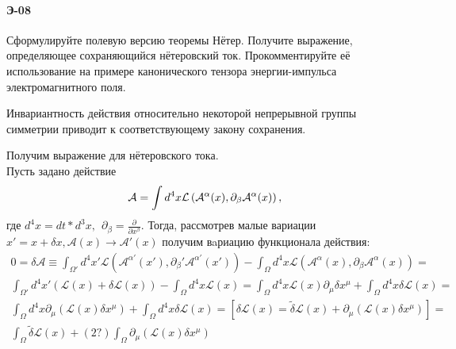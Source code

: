 


	\paragraph{Э-08}
	Сформулируйте полевую версию теоремы Нётер. Получите выражение, определяющее сохраняющийся нётеровский ток. Прокомментируйте её использование на примере канонического тензора энергии-импульса электромагнитного поля.
	
	\begin{theorem}[Нётер]
		Инвариантность действия относительно некоторой непрерывной группы симметрии приводит к соответствующему закону сохранения.
	\end{theorem}

	Получим выражение для нётеровского тока.\\
	Пусть задано действие 
	$$\mathcal{A}=\int d^4x\mathcal{L}\left( \mathcal{A}^\alpha (x),\partial_\beta \mathcal{A}^\alpha(x)\right),\\
	$$
	где $d^4x=dt*d^3x,~~\partial_\beta=\frac{\partial}{\partial x^\beta}.$ Тогда, рассмотрев малые вариации $x\prime=x+\delta x, \mathcal{A}(x)\rightarrow\mathcal{A}\prime(x)$ получим вaриацию функционала действия:
	\begin{gather*}
	0=\delta \mathcal{A}\equiv
	\int_{\Omega\prime}d^4x\prime\mathcal{L}\left(\mathcal{A}^{\alpha\prime}(x\prime),\partial_\beta\prime \mathcal{A}^{\alpha\prime}(x\prime)\right)-
	 \int_\Omega d^4x\mathcal{L}\left( \mathcal{A}^\alpha (x),\partial_\beta \mathcal{A}^\alpha(x)\right)=\\
	 \int_{\Omega\prime}d^4x\prime\left(\mathcal{L}(x)+\delta\mathcal{L}(x)\right)-
	 \int_\Omega d^4x\mathcal{L}\left(x\right)=
	 \int_\Omega d^4x\mathcal{L}(x)\partial_\mu\delta x^\mu+
	 \int_\Omega d^4x\delta\mathcal{L}(x)=\\
	 \int_\Omega d^4x\partial_\mu\left(\mathcal{L}(x)\delta x^\mu\right)+
	 \int_\Omega d^4x\delta\mathcal{L}(x)=
	 \left[\delta\mathcal{L}(x)=\tilde{\delta}\mathcal{L}(x)+
	 \partial_\mu\left(\mathcal{L}(x)\delta x^\mu\right)\right]=\\
	 \int_\Omega\tilde{\delta}\mathcal{L}(x)+(2?)
	 \int_\Omega\partial_\mu\left(\mathcal{L}(x)\delta x^\mu\right)
	 \end{gather*}
	 
